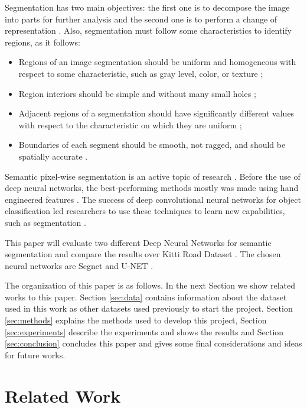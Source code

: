 \documentclass[10pt,twocolumn,letterpaper]{article}
\begin{document}
Segmentation has two main objectives: the first one is to decompose the image into parts for further analysis and the second one is to perform a change of representation \cite{DOMINGUEZ}. Also, segmentation must follow some characteristics to identify regions, as it follows:

\begin{itemize}
 \item Regions of an image segmentation should be uniform and homogeneous with respect to some characteristic, such as gray level, color, or texture \cite{DOMINGUEZ};
 \item Region interiors should be simple and without many small holes \cite{DOMINGUEZ};
 \item Adjacent regions of a segmentation should have significantly different values with respect to the characteristic on which they are uniform \cite{DOMINGUEZ};
 \item Boundaries of each segment should be smooth, not ragged, and should be spatially accurate \cite{DOMINGUEZ}.
\end{itemize}

Semantic pixel-wise segmentation is an active topic of research \cite{SEGNET}. Before the use of deep neural networks, the best-performing methods mostly was made using hand engineered features \cite{SEGNET}. The success of deep convolutional neural networks for object classification led researchers to use these techniques to learn new capabilities, such as segmentation \cite{SEGNET}.

This paper will evaluate two different Deep Neural Networks for semantic segmentation and compare the results over Kitti Road Dataset \cite{KITTI}. The chosen neural networks are Segnet \cite{SEGNET} and U-NET \cite{UNET}.

The organization of this paper is as follows. In the next Section we show related works to this paper. Section \ref{sec:data} contains information about the dataset used in this work as other datasets used previously to start the project. Section \ref{sec:methods} explains the methods used to develop this project, Section \ref{sec:experiments} describe the experiments and shows the results and Section \ref{sec:conclusion} concludes this paper and gives some final considerations and ideas for future works.


\section{Related Work} \label{sec:related_work}
\end{document}
